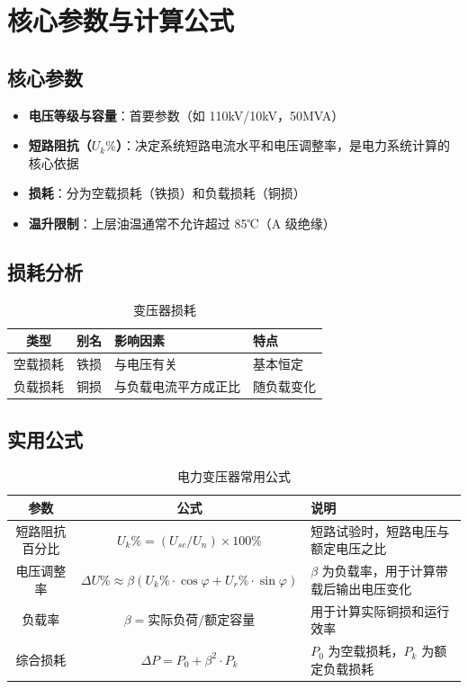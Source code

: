 \documentclass[12pt,UTF8]{ctexbook}
\begin{document}
\chapter{核心参数与计算公式}
\label{chap:power_params}

\section{核心参数}

\begin{itemize}[leftmargin=2cm]
    \item \textbf{电压等级与容量}：首要参数（如 110kV/10kV，50MVA）
    \item \textbf{短路阻抗（$U_k\%$）}：决定系统短路电流水平和电压调整率，是电力系统计算的核心依据
    \item \textbf{损耗}：分为空载损耗（铁损）和负载损耗（铜损）
    \item \textbf{温升限制}：上层油温通常不允许超过 85℃（A 级绝缘）
\end{itemize}

\section{损耗分析}

\begin{table}[htbp]
\centering
\caption{变压器损耗}
\begin{tabular}{|c|c|p{6cm}|p{4cm}|}
\hline
\textbf{类型} & \textbf{别名} & \textbf{影响因素} & \textbf{特点} \\
\hline
空载损耗 & 铁损 & 与电压有关 & 基本恒定 \\
\hline
负载损耗 & 铜损 & 与负载电流平方成正比 & 随负载变化 \\
\hline
\end{tabular}
\end{table}

\section{实用公式}

\begin{table}[htbp]
\centering
\caption{电力变压器常用公式}
\begin{tabular}{|c|c|p{6cm}|}
\hline
\textbf{参数} & \textbf{公式} & \textbf{说明} \\
\hline
短路阻抗百分比 & $U_k\% = (U_{sc} / U_n) \times 100\%$ & 短路试验时，短路电压与额定电压之比 \\
\hline
电压调整率 & $\Delta U\% \approx \beta (U_k\% \cdot \cos\varphi + U_r\% \cdot \sin\varphi)$ & $\beta$ 为负载率，用于计算带载后输出电压变化 \\
\hline
负载率 & $\beta = \text{实际负荷} / \text{额定容量}$ & 用于计算实际铜损和运行效率 \\
\hline
综合损耗 & $\Delta P = P_0 + \beta^2 \cdot P_k$ & $P_0$ 为空载损耗，$P_k$ 为额定负载损耗 \\
\hline
\end{tabular}
\end{table}
\end{document}

